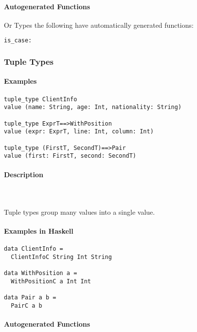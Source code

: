 \documentclass{article}
\def\H{Haskell}
\begin{document}
\paragraph{Autogenerated Functions}

Or Types the following have automatically generated functions:

\begin{verbatim}
is_case:
\end{verbatim}

\subsubsection{Tuple Types}

\paragraph{Examples}

\begin{verbatim}
tuple_type ClientInfo
value (name: String, age: Int, nationality: String)

tuple_type ExprT==>WithPosition
value (expr: ExprT, line: Int, column: Int)

tuple_type (FirstT, SecondT)==>Pair
value (first: FirstT, second: SecondT)
\end{verbatim}

\paragraph{Description}\mbox{} \\\\
Tuple types group many values into a single value.

\paragraph{Examples in \H}

\begin{verbatim}
data ClientInfo =
  ClientInfoC String Int String

data WithPosition a = 
  WithPositionC a Int Int

data Pair a b = 
  PairC a b
\end{verbatim}

\paragraph{Autogenerated Functions}
\end{document}
